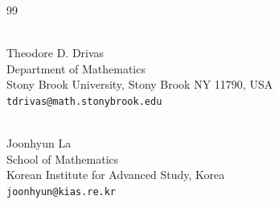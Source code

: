 \documentclass[12pt]{article}
\begin{document}
\begin{thebibliography}{99}
\end{thebibliography}



\vspace{-2mm}

\qquad\\
Theodore D. Drivas\\
Department of Mathematics\\
Stony Brook University, Stony Brook NY 11790, USA\\
{\tt tdrivas@math.stonybrook.edu}






\qquad\\
Joonhyun La\\
School of Mathematics\\
Korean Institute for Advanced Study, Korea\\
{\tt joonhyun@kias.re.kr}
\end{document}
